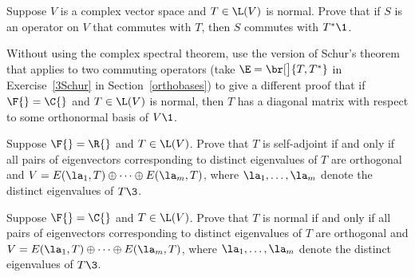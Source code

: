 \exercise
Suppose $V$ is a complex vector space and $T \in \L(V)$ is normal. Prove that if $S$ is an operator on $V$ that commutes with $T$, then $S$ commutes with $T^*\1$.

\exercise
Without using the complex spectral theorem, use the version of Schur's theorem that applies to two commuting operators \big(take
$\E = \br[\big]{T, T^*}$ in Exercise~\ref{3Schur} in Section~\ref{orthobases}\big) to give a different proof that if $\F{} = \C{}$ and $T \in \L(V)$ is normal, then $T$ has a diagonal matrix with respect to some orthonormal basis of $V\1$.\label{AltCST}


\exercise
Suppose $\F{} = \R{}$ and $T \in \L(V)$. Prove that $T$ is self-adjoint if and  only if all pairs of eigenvectors corresponding to distinct eigenvalues of $T$ are orthogonal and
$
V = E(\la_1, T) \oplus \dots \oplus E(\la_m, T)$,
where $\la_1, \dots, \la_m$ denote the distinct eigenvalues of $T\3$.\label{7dirsum}


\exercise
Suppose $\F{} = \C{}$ and $T \in \L(V)$. Prove that $T$ is normal if and  only if all pairs of eigenvectors corresponding to distinct eigenvalues of $T$ are orthogonal and\label{7dirsum2}
$
V = E(\la_1, T) \oplus \dots \oplus E(\la_m, T)$,
where $\la_1, \dots, \la_m$ denote the distinct eigenvalues of $T\3$.


